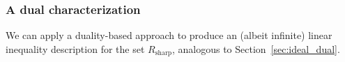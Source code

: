 \documentclass[smallextended]{svjour3}
\newcommand{\TODO}[1]{\textbf{\color{red} TODO: }{\emph{#1}}}
\newcommand{\Rcayley}{R_{\operatorname{cayley}}}
\newcommand{\Rsharp}{R_{\operatorname{sharp}}}
\renewcommand{\bar}[1]{\overline{#1}}
\begin{document}


\subsubsection{A dual characterization}

We can apply a duality-based approach to produce an (albeit infinite) linear inequality description for the set $\Rsharp$, analogous to Section~\ref{sec:ideal_dual}. %
\end{document}
